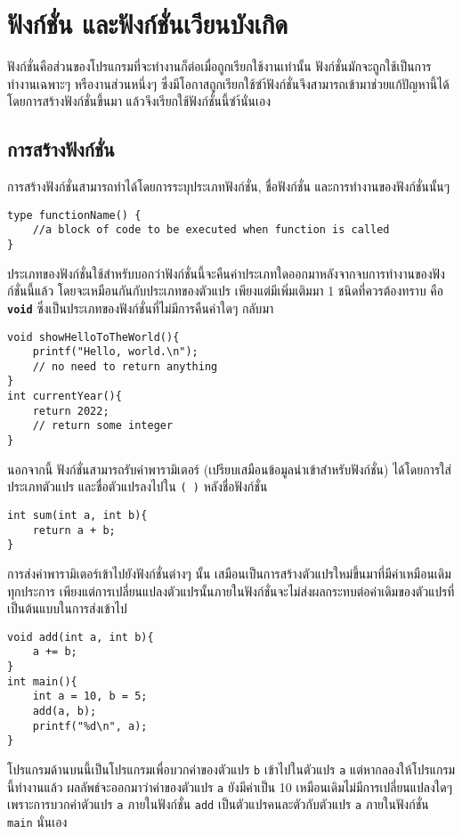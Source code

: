 \chapter{ฟังก์ชั่น และฟังก์ชั่นเวียนบังเกิด}
ฟังก์ชั่นคือส่วนของโปรแกรมที่จะทำงานก็ต่อเมื่อถูกเรียกใช้งานเท่านั้น ฟังก์ชั่นมักจะถูกใช้เป็นการทำงานเฉพาะๆ หรืองานส่วนหนึ่งๆ ซึ่งมีโอกาสถูกเรียกใช้ซำ้ฟังก์ชั่นจึงสามารถเข้ามาช่วยแก้ปัญหานี้ได้ โดยการสร้างฟังก์ชั่นขึ้นมา แล้วจึงเรียกใช้ฟังก์ชั่นนี้ซำ้นั่นเอง

\section{การสร้างฟังก์ชั่น}
การสร้างฟังก์ชั่นสามารถทำได้โดยการระบุประเภทฟังก์ชั่น, ชื่อฟังก์ชั่น และการทำงานของฟังก์ชั่นนั้นๆ
\begin{lstlisting}
type functionName() {
	//a block of code to be executed when function is called
}
\end{lstlisting}
ประเภทของฟังก์ชั่นใช้สำหรับบอกว่าฟังก์ชั่นนี้จะคืนค่าประเภทใดออกมาหลังจากจบการทำงานของฟังก์ชั่นนี้แล้ว โดยจะเหมือนกันกับประเภทของตัวแปร เพียงแต่มีเพิ่มเติมมา 1 ชนิดที่ควรต้องทราบ คือ \textbf{\texttt{void}} ซึ่งเป็นประเภทของฟังก์ชั่นที่ไม่มีการคืนค่าใดๆ กลับมา
\begin{lstlisting}
void showHelloToTheWorld(){
	printf("Hello, world.\n");
	// no need to return anything
}
int currentYear(){
	return 2022;
	// return some integer
}
\end{lstlisting}

นอกจากนี้ ฟังก์ชั่นสามารถรับค่าพารามิเตอร์ (เปรียบเสมือนข้อมูลนำเข้าสำหรับฟังก์ชั่น) ได้โดยการใส่ประเภทตัวแปร และชื่อตัวแปรลงไปใน \texttt{( )} หลังชื่อฟังก์ชั่น
\begin{lstlisting}
int sum(int a, int b){
	return a + b;
}
\end{lstlisting}

การส่งค่าพารามิเตอร์เข้าไปยังฟังก์ชั่นต่างๆ นั้น เสมือนเป็นการสร้างตัวแปรใหม่ขึ้นมาที่มีค่าเหมือนเดิมทุกประการ เพียงแต่การเปลี่ยนแปลงตัวแปรนั้นภายในฟังก์ชั่นจะไม่ส่งผลกระทบต่อค่าเดิมของตัวแปรที่เป็นต้นแบบในการส่งเข้าไป
\begin{lstlisting}
void add(int a, int b){
	a += b;
}
int main(){
	int a = 10, b = 5;
	add(a, b);
	printf("%d\n", a);
}
\end{lstlisting}
โปรแกรมด้านบนนี้เป็นโปรแกรมเพื่อบวกค่าของตัวแปร \texttt{b} เข้าไปในตัวแปร \texttt{a} แต่หากลองให้โปรแกรมนี้ทำงานแล้ว ผลลัพธ์จะออกมาว่าค่าของตัวแปร \texttt{a} ยังมีค่าเป็น 10 เหมือนเดิมไม่มีการเปลี่ยนแปลงใดๆ เพราะการบวกค่าตัวแปร \texttt{a} ภายในฟังก์ชั่น \texttt{add} เป็นตัวแปรคนละตัวกับตัวแปร \texttt{a} ภายในฟังก์ชั่น \texttt{main} นั่นเอง

